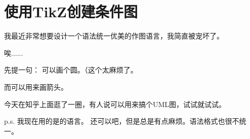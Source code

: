 \section{使用TikZ创建条件图}

我最近非常想要设计一个语法统一优美的作图语言，我简直被宠坏了。

唉......

先提一句：
可以画个圆。（这个太麻烦了。

而可以用来画箭头。

今天在知乎上面逛了一圈，有人说可以用来搞个UML图，试试就试试。

p.s. 我现在用的是的语言。
还可以吧，但是总是有点麻烦。语法格式也很不统一。
